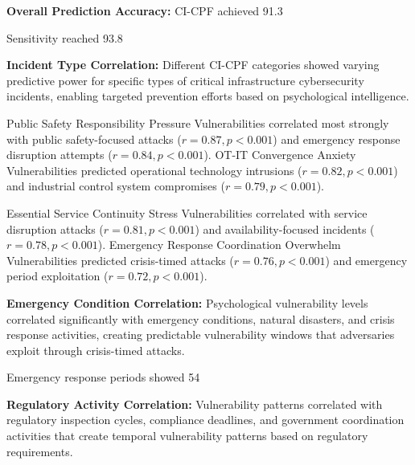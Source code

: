 \documentclass[10pt, twocolumn]{article}
\begin{document}
\textbf{Overall Prediction Accuracy:} CI-CPF achieved 91.3%

Sensitivity reached 93.8%

\textbf{Incident Type Correlation:} Different CI-CPF categories showed varying predictive power for specific types of critical infrastructure cybersecurity incidents, enabling targeted prevention efforts based on psychological intelligence.

Public Safety Responsibility Pressure Vulnerabilities correlated most strongly with public safety-focused attacks ($r = 0.87, p < 0.001$) and emergency response disruption attempts ($r = 0.84, p < 0.001$). OT-IT Convergence Anxiety Vulnerabilities predicted operational technology intrusions ($r = 0.82, p < 0.001$) and industrial control system compromises ($r = 0.79, p < 0.001$).

Essential Service Continuity Stress Vulnerabilities correlated with service disruption attacks ($r = 0.81, p < 0.001$) and availability-focused incidents ($r = 0.78, p < 0.001$). Emergency Response Coordination Overwhelm Vulnerabilities predicted crisis-timed attacks ($r = 0.76, p < 0.001$) and emergency period exploitation ($r = 0.72, p < 0.001$).

\textbf{Emergency Condition Correlation:} Psychological vulnerability levels correlated significantly with emergency conditions, natural disasters, and crisis response activities, creating predictable vulnerability windows that adversaries exploit through crisis-timed attacks.

Emergency response periods showed 54%

\textbf{Regulatory Activity Correlation:} Vulnerability patterns correlated with regulatory inspection cycles, compliance deadlines, and government coordination activities that create temporal vulnerability patterns based on regulatory requirements.
\end{document}
